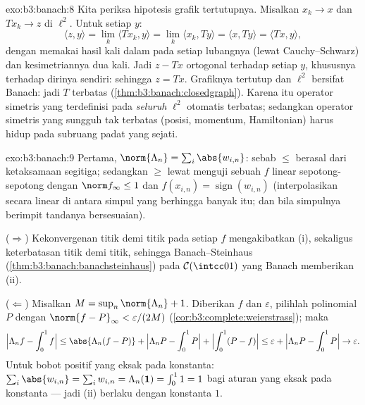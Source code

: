 \begin{solution}{exo:b3:banach:8}
Kita periksa hipotesis grafik tertutupnya. Misalkan $x_k \to x$ dan
$Tx_k \to z$ di $\ell^2$. Untuk setiap $y$:
\[
\langle z, y\rangle = \lim_k\langle Tx_k, y\rangle
= \lim_k \langle x_k, Ty\rangle = \langle x, Ty\rangle
= \langle Tx, y\rangle,
\]
dengan memakai  hasil kali dalam pada setiap lubangnya
(lewat Cauchy--Schwarz) dan kesimetriannya dua kali. Jadi $z - Tx$ ortogonal
terhadap setiap $y$, khususnya terhadap dirinya sendiri: sehingga $z = Tx$. Grafiknya
tertutup dan $\ell^2$ bersifat Banach: jadi $T$ terbatas
(\cref{thm:b3:banach:closedgraph}). Karena itu operator simetris yang
terdefinisi pada \emph{seluruh} $\ell^2$ otomatis terbatas;
sedangkan operator simetris yang sungguh tak terbatas (posisi, momentum,
Hamiltonian) harus hidup pada subruang padat yang sejati.
\end{solution}

\begin{solution}{exo:b3:banach:9}
Pertama, $\norm{\Lambda_n} = \sum_i\abs{w_{i,n}}$: sebab $\leq$ berasal dari
ketaksamaan segitiga; sedangkan $\geq$ lewat menguji sebuah $f$ linear sepotong-sepotong
dengan $\norm f_\infty \leq 1$ dan $f(x_{i,n}) =
\operatorname{sign}(w_{i,n})$ (interpolasikan secara linear di antara
simpul yang berhingga banyak itu; dan bila simpulnya berimpit tandanya bersesuaian).

($\Rightarrow$) Kekonvergenan titik demi titik pada setiap $f$ mengakibatkan (i),
sekaligus keterbatasan titik demi titik, sehingga Banach--Steinhaus
(\cref{thm:b3:banach:banachsteinhaus}) pada $\mathcal
C(\intcc01)$ yang Banach memberikan (ii).

($\Leftarrow$) Misalkan $M = \sup_n\norm{\Lambda_n} + 1$. Diberikan $f$
dan $\varepsilon$, pilihlah polinomial $P$ dengan $\norm{f -
P}_\infty < \varepsilon/(2M)$
(\cref{cor:b3:complete:weierstrass}); maka
\[
\Bigl|\Lambda_n f - \int_0^1 f\Bigr|
\leq \abs{\Lambda_n(f - P)} + \Bigl|\Lambda_nP -
\int_0^1P\Bigr| + \Bigl|\int_0^1(P - f)\Bigr|
\leq \varepsilon + \Bigl|\Lambda_nP - \int_0^1P\Bigr| \to
\varepsilon .
\]
Untuk bobot positif yang eksak pada konstanta: $\sum_i\abs{w_{i,n}}
= \sum_iw_{i,n} = \Lambda_n(\mathbf 1) = \int_0^1 1 = 1$ bagi
aturan yang eksak pada konstanta --- jadi (ii) berlaku dengan konstanta $1$.
\end{solution}

